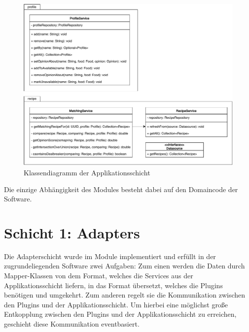 \begin{figure}[ht!]
    \includegraphics[width=0.98\columnwidth]{../diagrams/application_uml.pdf}
    \caption{Klassendiagramm der Applikationsschicht}
    \label{fig:class-diag-application}
\end{figure}

Die einzige Abhängigkeit des Modules besteht dabei auf den Domaincode der Software.

\section{Schicht 1: Adapters}
Die Adapterschicht wurde im Module \href{https://github.com/anditru/quickie/tree/bb41442c7f1ffbfcd3117cd86a40f7932e543a33/1-quickie-adapters}{} implementiert und erfüllt in der zugrundeliegenden Software zwei Aufgaben: Zum einen werden die Daten durch Mapper-Klassen von dem Format, welches die Services aus der Applikationsschicht liefern, in das Format übersetzt, welches die Plugins benötigen und umgekehrt. Zum anderen regelt sie die Kommunikation zwischen den Plugins und der Applikationsschicht. Um hierbei eine möglichst große Entkopplung zwischen den Plugins und der Applikationsschicht zu erreichen, geschieht diese Kommunikation eventbasiert.


